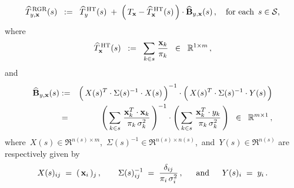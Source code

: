 \begin{definition}
\begin{equation*}
\widehat{T}^{\,\textnormal{RGR}}_{y,\mathbf{x}}(s)
\;\; := \;\;
	\widehat{T}^{\,\textnormal{HT}}_{y}(s)
	\; + \;
	\left(\,T_{\mathbf{x}} - \widehat{T}^{\,\textnormal{HT}}_{\mathbf{x}}(s) \,\right)
	\cdot
	\widehat{\mathbf{B}}_{y,\mathbf{x}}(s)\,,
	\quad\textnormal{for each \,$s \in \mathcal{S}$},
\end{equation*}
where
\begin{equation*}
\widehat{T}^{\,\textnormal{HT}}_{\mathbf{x}}(s)
\;\; := \;\;
	\underset{k \in s}{\sum}\;\dfrac{\mathbf{x}_{k}}{\pi_{k}}
	\;\; \in \;\;
	\Re^{1 \times m}\,,
\end{equation*}
and
\begin{eqnarray*}
\widehat{\mathbf{B}}_{y,\mathbf{x}}(s)
& := &
	\left(\,X(s)^{T} \overset{{\color{white}!}}{\cdot} \Sigma(s)^{-1} \cdot X(s)\,\right)^{-1}
	\cdot
	\left(\,X(s)^{T} \overset{{\color{white}!}}{\cdot} \Sigma(s)^{-1} \cdot Y(s) \,\right)
\\
& = &
	\left(\,\underset{k \in s}{\sum}\;\dfrac{\mathbf{x}_{k}^{T} \cdot \mathbf{x}_{k}}{\pi_{k}\,\sigma_{k}^{2}} \,\right)^{-1}
	\cdot
	\left(\,\underset{k \in s}{\sum}\;\dfrac{\mathbf{x}_{k}^{T} \cdot y_{k}}{\pi_{k}\,\sigma_{k}^{2}} \,\right)
	\;\; \in \;\;
	\Re^{m \times 1}\,,
\end{eqnarray*}
where \,$X(s) \in \Re^{n(s) \times m}$,\, $\Sigma(s)^{-1} \in \Re^{n(s) \times n(s)}$,\, and \,$Y(s) \in \Re^{n(s)}$
are respectively given by
\begin{equation*}
	X(s)_{ij} \; = \; (\,\mathbf{x}_{i}\,)_{j}\,,
\quad\quad
	\Sigma(s)^{-1}_{ij} \; = \; \dfrac{\delta_{ij}}{\pi_{i}\,\sigma^{2}_{i}}\,,
\quad\;\;\textnormal{and}\quad\;\;
	Y(s)_{i} \; = \; y_{i}\,.
\end{equation*}
\end{definition}


